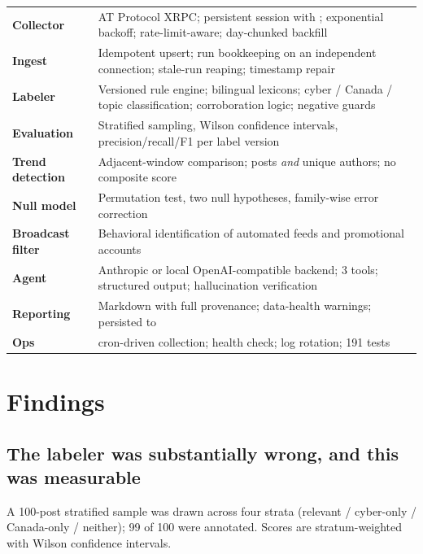\documentclass[11pt]{article}
\begin{document}
\noindent
\begin{tabularx}{\textwidth}{@{}>{\raggedright\arraybackslash}p{} L@{}}
\toprule
{} &  \\
\midrule
\textbf{Collector} & AT Protocol XRPC; persistent session with ; exponential backoff; rate-limit-aware; day-chunked backfill \\
\textbf{Ingest} & Idempotent upsert; run bookkeeping on an independent connection; stale-run reaping; timestamp repair \\
\textbf{Labeler} & Versioned rule engine; bilingual lexicons; cyber / Canada / topic classification; corroboration logic; negative guards \\
\textbf{Evaluation} & Stratified sampling, Wilson confidence intervals, precision/recall/F1 per label version \\
\textbf{Trend detection} & Adjacent-window comparison; posts \emph{and} unique authors; no composite score \\
\textbf{Null model} & Permutation test, two null hypotheses, family-wise error correction \\
\textbf{Broadcast filter} & Behavioral identification of automated feeds and promotional accounts \\
\textbf{Agent} & Anthropic or local OpenAI-compatible backend; 3 tools; structured output; hallucination verification \\
\textbf{Reporting} & Markdown with full provenance; data-health warnings; persisted to  \\
\textbf{Ops} & cron-driven collection; health check; log rotation; 191 tests \\
\bottomrule
\end{tabularx}

\section{Findings}

\subsection{The labeler was substantially wrong, and this was measurable}
\label{sec:labeler}

A 100-post stratified sample was drawn across four strata (relevant /
cyber-only / Canada-only / neither); 99 of 100 were annotated. Scores are
stratum-weighted with Wilson confidence intervals.
\end{document}
